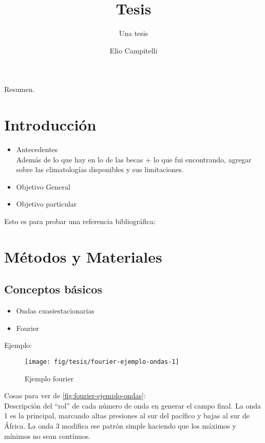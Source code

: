 \documentclass[spanish,a4paper]{book}
\title{Tesis}
\subtitle{Una tesis}
\author{Elio Campitelli}
\date{}
\providecommand{\tightlist}{%
  \setlength{\itemsep}{0pt}\setlength{\parskip}{0pt}}
\begin{document}
\maketitle

{
\setcounter{tocdepth}{3}
\tableofcontents
}
Resumen.

\chapter{Introducción}\label{introduccion}

\begin{itemize}
\tightlist
\item
  Antecedentes\\
  Además de lo que hay en lo de las becas + lo que fui encontrando,
  agregar sobre las climatologías disponibles y sus limitaciones.
\item
  Objetivo General
\item
  Objetivo particular
\end{itemize}

Esto es para probar una referencia bibliográfica: \cite{@Vera2004}

\chapter{Métodos y Materiales}\label{metodos-y-materiales}

\section{Conceptos básicos}\label{conceptos-basicos}

\begin{itemize}
\tightlist
\item
  Ondas cuasiestacionarias
\item
  Fourier
\end{itemize}

Ejemplo:

\begin{figure*}
\texttt{[image: fig/tesis/fourier-ejemplo-ondas-1]} \caption{Ejemplo fourier}\label{fig:fourier-ejemplo-ondas}
\end{figure*}

Cosas para ver de \autoref{fig:fourier-ejemplo-ondas}:\\
Descripción del ``rol'' de cada número de onda en generar el campo
final. La onda 1 es la principal, marcando altas presiones al sur del
pacífico y bajas al sur de África. La onda 3 modifica ese patrón simple
haciendo que los máximos y mínimos no sean contínuos.
\end{document}
